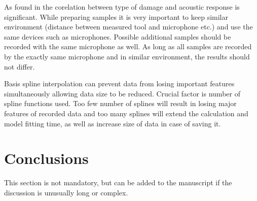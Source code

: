 \documentclass[energies,article,submit,pdftex,moreauthors]{Definitions/mdpi}
\begin{document}
As found in \cite{ref-motors} the corelation between type of damage and acoustic response is significant. While preparing samples it is very important to keep similar environment (distance between measured tool and microphone etc.) and use the same devices such as microphones. Possible additional samples should be recorded with the same microphone as well. As long as all samples are recorded by the exactly same microphone and in similar environment, the results should not differ.

Basis spline interpolation can prevent  data from losing important features simultaneously allowing data size to be reduced. Crucial factor is number of spline functions used. Too few number of splines will result in losing major features of recorded data and too many splines will extend the calculation and model fitting time, as well as increase size of data in case of saving it.

\section{Conclusions}

This section is not mandatory, but can be added to the manuscript if the discussion is unusually long or complex.

\vspace{6pt} 



\end{document}
